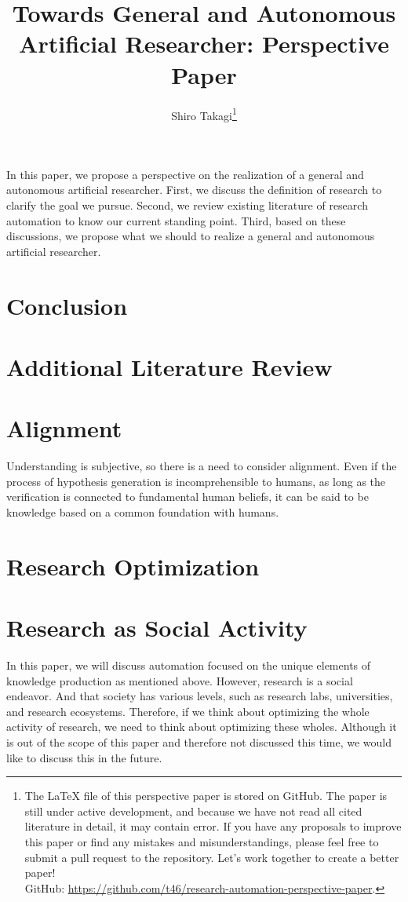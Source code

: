 \documentclass{book}
\title{Towards General and Autonomous Artificial Researcher: Perspective Paper}
\author{Shiro Takagi\footnote{The LaTeX file of this perspective paper is stored on GitHub. The paper is still under active development, and because we have not read all cited literature in detail, it may contain error. If you have any proposals to improve this paper or find any mistakes and misunderstandings, please feel free to submit a pull request to the repository. Let's work together to create a better paper! \\ GitHub: \url{https://github.com/t46/research-automation-perspective-paper}. }}
\newenvironment{abstract}{}{}
\begin{document}
\sloppy
\maketitle
\tableofcontents

\begin{abstract}
    In this paper, we propose a perspective on the realization of a general and autonomous artificial researcher. First, we discuss the definition of research to clarify the goal we pursue. Second, we review existing literature of research automation to know our current standing point. Third, based on these discussions, we propose what we should to realize a general and autonomous artificial researcher.
\end{abstract}








\chapter{Conclusion}


% 



\appendix

\chapter{Additional Literature Review}

\chapter{Alignment}
Understanding is subjective, so there is a need to consider alignment. Even if the process of hypothesis generation is incomprehensible to humans, as long as the verification is connected to fundamental human beliefs, it can be said to be knowledge based on a common foundation with humans.

\chapter{Research Optimization}

\chapter{Research as Social Activity}
In this paper, we will discuss automation focused on the unique elements of knowledge production as mentioned above. However, research is a social endeavor. And that society has various levels, such as research labs, universities, and research ecosystems. Therefore, if we think about optimizing the whole activity of research, we need to think about optimizing these wholes. Although it is out of the scope of this paper and therefore not discussed this time, we would like to discuss this in the future.
\end{document}
